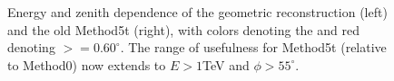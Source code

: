 \documentclass[main.tex]{subfiles}
\begin{document}
\begin{figure}[htbp]
  \centering
  \caption[Energy and zenith dependence of Method0 and the old Method5t]{Energy and zenith dependence of the geometric reconstruction (left) and the old Method5t (right), with colors denoting the \rse and red denoting \rse$>=0.60^\circ$. The range of usefulness for Method5t (relative to Method0) now extends to $E>1$TeV and $\phi>55^\circ$.}
  \label{fig:energy_contour}
\end{figure}

\end{document}
